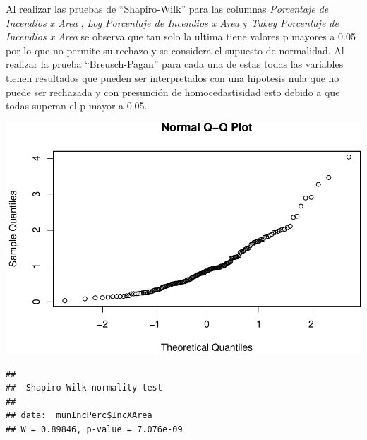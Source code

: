 \documentclass[11pt,]{article}
\newenvironment{Shaded}{\begin{snugshade}}{\end{snugshade}}
\newcommand{\KeywordTok}[1]{\textcolor[rgb]{0.13,0.29,0.53}{\textbf{#1}}}
\newcommand{\CommentTok}[1]{\textcolor[rgb]{0.56,0.35,0.01}{\textit{#1}}}
\newcommand{\OperatorTok}[1]{\textcolor[rgb]{0.81,0.36,0.00}{\textbf{#1}}}
\newcommand{\NormalTok}[1]{#1}
\begin{document}
Al realizar las pruebas de ``Shapiro-Wilk'' para las columnas
\emph{Porcentaje de Incendios x Area }, \emph{Log Porcentaje de
Incendios x Area} y \emph{Tukey Porcentaje de Incendios x Area} se
observa que tan solo la ultima tiene valores p mayores a 0.05 por lo que
no permite su rechazo y se considera el supuesto de normalidad. Al
realizar la prueba ``Breusch-Pagan'' para cada una de estas todas las
variables tienen resultados que pueden ser interpretados con una
hipotesis nula que no puede ser rechazada y con presunción de
homocedastisidad esto debido a que todas superan el p mayor a 0.05.

\begin{Shaded}
\end{Shaded}

\includegraphics{proyecto_files/figure-latex/unnamed-chunk-27-1.pdf}

\begin{Shaded}
\end{Shaded}

\begin{verbatim}
## 
##  Shapiro-Wilk normality test
## 
## data:  munIncPerc$IncXArea
## W = 0.89846, p-value = 7.076e-09
\end{verbatim}

\begin{Shaded}
\end{Shaded}
\end{document}
